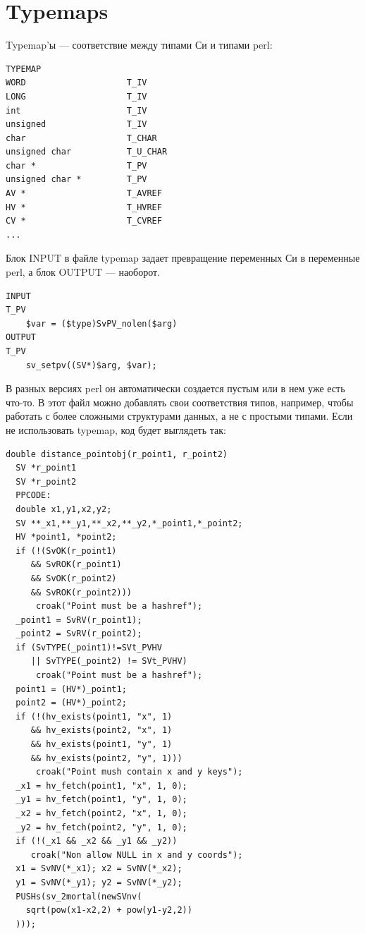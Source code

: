 \section{Typemaps} %
Typemap'ы --- соответствие между типами Си и типами perl:
\begin{verbatim}
TYPEMAP
WORD                    T_IV
LONG                    T_IV
int                     T_IV
unsigned                T_IV
char                    T_CHAR
unsigned char           T_U_CHAR
char *                  T_PV
unsigned char *         T_PV
AV *                    T_AVREF
HV *                    T_HVREF
CV *                    T_CVREF
...
\end{verbatim}
Блок INPUT в файле typemap задает превращение переменных Си в переменные perl, а блок OUTPUT --- наоборот.
\begin{verbatim}
INPUT
T_PV
    $var = ($type)SvPV_nolen($arg)
OUTPUT
T_PV
    sv_setpv((SV*)$arg, $var);
\end{verbatim}
В разных версиях perl он автоматически создается пустым или в нем уже есть что-то. В этот файл можно добавлять свои соответствия типов, например, чтобы работать с более сложными структурами данных, а не с простыми типами. Если не использовать typemap, код будет выглядеть так:
\begin{verbatim}
double distance_pointobj(r_point1, r_point2)
  SV *r_point1
  SV *r_point2
  PPCODE:
  double x1,y1,x2,y2;
  SV **_x1,**_y1,**_x2,**_y2,*_point1,*_point2;
  HV *point1, *point2;
  if (!(SvOK(r_point1)
     && SvROK(r_point1)
     && SvOK(r_point2)
     && SvROK(r_point2)))
      croak("Point must be a hashref");
  _point1 = SvRV(r_point1);
  _point2 = SvRV(r_point2);
  if (SvTYPE(_point1)!=SVt_PVHV
     || SvTYPE(_point2) != SVt_PVHV)
      croak("Point must be a hashref");
  point1 = (HV*)_point1;
  point2 = (HV*)_point2;
  if (!(hv_exists(point1, "x", 1)
     && hv_exists(point2, "x", 1)
     && hv_exists(point1, "y", 1)
     && hv_exists(point2, "y", 1)))
      croak("Point mush contain x and y keys");
  _x1 = hv_fetch(point1, "x", 1, 0);
  _y1 = hv_fetch(point1, "y", 1, 0);
  _x2 = hv_fetch(point2, "x", 1, 0);
  _y2 = hv_fetch(point2, "y", 1, 0);
  if (!(_x1 && _x2 && _y1 && _y2))
     croak("Non allow NULL in x and y coords");
  x1 = SvNV(*_x1); x2 = SvNV(*_x2);
  y1 = SvNV(*_y1); y2 = SvNV(*_y2);
  PUSHs(sv_2mortal(newSVnv(
    sqrt(pow(x1-x2,2) + pow(y1-y2,2))
  )));
\end{verbatim}


